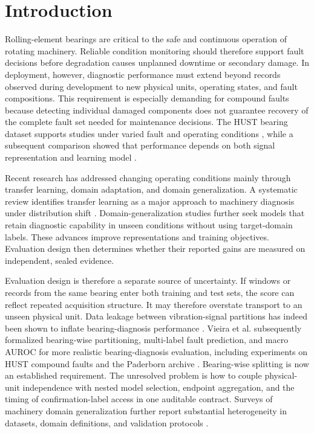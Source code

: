 \documentclass[machines,article,submit,oneauthor,pdftex]{Definitions/mdpi}
\begin{document}
\section{Introduction}

Rolling-element bearings are critical to the safe and continuous operation of rotating machinery. Reliable condition monitoring should therefore support fault decisions before degradation causes unplanned downtime or secondary damage. In deployment, however, diagnostic performance must extend beyond records observed during development to new physical units, operating states, and fault compositions. This requirement is especially demanding for compound faults because detecting individual damaged components does not guarantee recovery of the complete fault set needed for maintenance decisions. The HUST bearing dataset supports studies under varied fault and operating conditions \cite{r01,r45}, while a subsequent comparison showed that performance depends on both signal representation and learning model \cite{r02}.

Recent research has addressed changing operating conditions mainly through transfer learning, domain adaptation, and domain generalization. A systematic review identifies transfer learning as a major approach to machinery diagnosis under distribution shift \cite{r03}. Domain-generalization studies further seek models that retain diagnostic capability in unseen conditions without using target-domain labels. These advances improve representations and training objectives. Evaluation design then determines whether their reported gains are measured on independent, sealed evidence.

Evaluation design is therefore a separate source of uncertainty. If windows or records from the same bearing enter both training and test sets, the score can reflect repeated acquisition structure. It may therefore overstate transport to an unseen physical unit. Data leakage between vibration-signal partitions has indeed been shown to inflate bearing-diagnosis performance \cite{r32}. Vieira et al. subsequently formalized bearing-wise partitioning, multi-label fault prediction, and macro AUROC for more realistic bearing-diagnosis evaluation, including experiments on HUST compound faults and the Paderborn archive \cite{r44}. Bearing-wise splitting is now an established requirement. The unresolved problem is how to couple physical-unit independence with nested model selection, endpoint aggregation, and the timing of confirmation-label access in one auditable contract. Surveys of machinery domain generalization further report substantial heterogeneity in datasets, domain definitions, and validation protocols \cite{r33,r34}.
\end{document}
